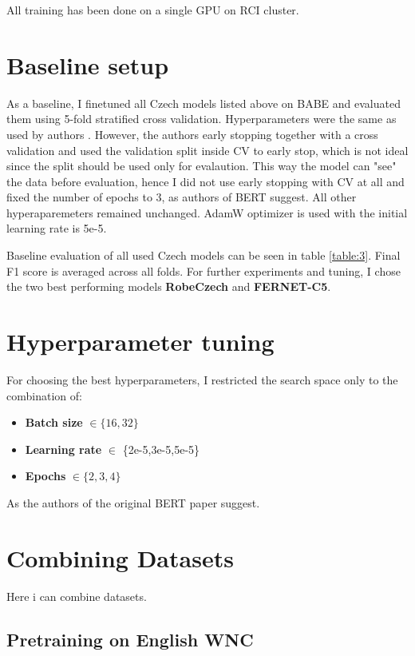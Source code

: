  
 
 
 
All training has been done on a single GPU on RCI cluster.
 \section{Baseline setup}
 As a baseline, I finetuned all Czech models listed above on BABE and evaluated them using 5-fold stratified cross validation. Hyperparameters were the same as used by authors \cite{Spinde2021MBIC}. However, the authors early stopping together with a cross validation and used the validation split inside CV to early stop, which is not ideal since the split should be used only for evalaution. This way the model can "see" the data before evaluation, hence I did not use early stopping with CV at all and fixed the number of epochs to 3, as authors of BERT \cite{devlin2019bert} suggest. 
 All other hyperaparemeters remained unchanged. AdamW optimizer is used with the initial learning rate is 5e-5. 
 
 Baseline evaluation of all used Czech models can be seen in table \ref{table:3}. Final F1 score is averaged across all folds. For further experiments and tuning, I chose the two best performing models \textbf{RobeCzech} and \textbf{FERNET-C5}.
 
 
 
 
 \section{Hyperparameter tuning}
For choosing the best hyperparameters, I restricted the search space only to the combination of:
 \begin{itemize}
     \item \textbf{Batch size} $\in \{16,32\}$
     \item \textbf{Learning rate} $\in $ \{2e-5,3e-5,5e-5\}
     \item \textbf{Epochs} $\in \{2,3,4\}$
 \end{itemize}
 
 As the authors of the original BERT paper suggest. 
 
  

 
 
 \section{Combining Datasets}
 Here i can combine datasets.
 \subsection{Pretraining on English WNC}
